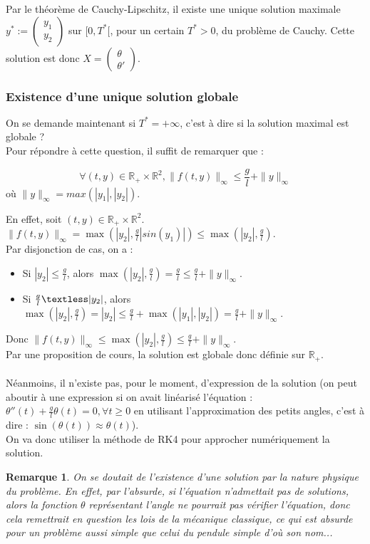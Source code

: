 \documentclass[9pt,a4paper]{article}
\newtheorem{rem}{Remarque}
\begin{document}
Par le théorème de Cauchy-Lipschitz, il existe une unique solution maximale $y^*:=\begin{pmatrix}
    y_1\\
    y_2
\end{pmatrix}$ sur $[0,T^*[$, pour un certain $T^* > 0$, du problème de Cauchy. Cette solution est donc $X = \begin{pmatrix}
    \theta\\
    \theta'
\end{pmatrix}$.\\
\subsubsection{Existence d'une unique solution globale}
On se demande maintenant si $T^* = +\infty$, c'est à dire si la solution maximal est globale ?\\
Pour répondre à cette question, il suffit de remarquer que :
\begin{tcolorbox}[colback=green!5!white, colframe=green!50!black]
    $$
    \forall(t,y) \in \mathbb{R}_+ \times \mathbb{R}^2, \|f(t,y)\|_\infty \leq \frac{g}{l} + \|y\|_\infty
    $$
    où $\|y\|_\infty = max(|y_1|,|y_2|)$.
\end{tcolorbox}
En effet, soit $(t,y) \in \mathbb{R}_+ \times \mathbb{R}^2$. $\|f(t,y)\|_\infty = \max(|y_2|,\frac{g}{l}|sin(y_1)|) \leq \max(|y_2|,\frac{g}{l})$.\\
Par disjonction de cas, on a :
\begin{itemize}[label=\textbullet]
    \item Si $|y_2| \leq \frac{g}{l}$, alors $\max(|y_2|,\frac{g}{l}) = \frac{g}{l} \leq \frac{g}{l} + \|y\|_\infty$.
    \item Si $\frac{g}{l} \textless |y_2|$, alors $\max(|y_2|,\frac{g}{l}) = |y_2| \leq \frac{g}{l} + \max(|y_1|,|y_2|) = \frac{g}{l} + \|y\|_\infty$.
\end{itemize} 
Donc $\|f(t,y)\|_\infty \leq \max(|y_2|, \frac{g}{l}) \leq \frac{g}{l} + \|y\|_\infty$.\\
Par une proposition de cours, la solution est globale donc définie sur $\mathbb{R}_+$.\\\\
Néanmoins, il n'existe pas, pour le moment, d'expression de la solution (on peut aboutir à une expression si on avait linéarisé l'équation : $\theta''(t)+\frac{g}{l}\theta(t) = 0, \forall t \geq 0$ en utilisant l'approximation des petits angles, c'est à dire : $\sin(\theta(t)) \approx \theta(t)$).\\
On va donc utiliser la méthode de RK4 pour approcher numériquement la solution.
\begin{tcolorbox}
    \begin{rem}
        On se doutait de l'existence d'une solution par la nature physique du problème. En effet, par l'absurde, si l'équation n'admettait pas de solutions, alors la fonction $\theta$ représentant l'angle ne pourrait pas vérifier l'équation, donc cela remettrait en question les lois de la mécanique classique, ce qui est absurde pour un problème aussi simple que celui du pendule simple d'où son nom...
    \end{rem}
\end{tcolorbox}
\end{document}
